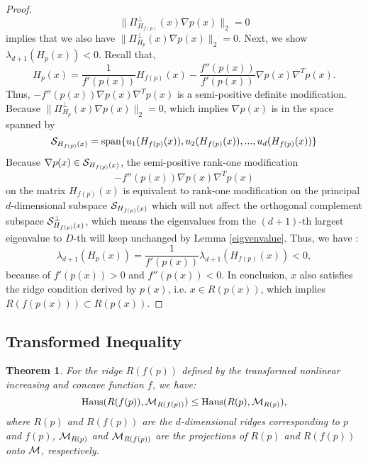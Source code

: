 \documentclass[aos,preprint]{imsart}
\newtheorem{theorem}{Theorem}[section]
\theoremstyle{remark}
\begin{document}
\begin{appendix}
\begin{proof}
\[
\|\Pi_{H_{f(p)}}^{\perp}(x)\nabla p(x)\|_2=0
\] 
implies that we also have $\|\Pi_{H_p}^\perp(x)\nabla p(x)\|_2=0$. Next, we show $\lambda_{d+1}(H_p(x)) < 0$. Recall that, 
\[
 H_{p}(x) =\frac{1}{ f'(p(x))} H_{f(p)}(x) - \frac{f''(p(x))}{ f'(p(x))} \nabla p(x) \nabla^T p(x) .
\]
 Thus, $-{f''(p(x))} \nabla p(x) \nabla^T p(x)$ is a semi-positive definite modification.
 Because $\|\Pi_{H_p}^\perp(x)\nabla p(x)\|_2=0$,  which implies $\nabla p(x)$ is in the space spanned by
 \[
 {\cal S}_{H_{f(p)}(x)} = {\rm span}\{ u_1(H_{f(p)}(x)), u_2(H_{f(p)}(x)),..., u_d(H_{f(p)}(x))\}
 \]
 Because $\nabla p(x) \in  {\cal S}_{H_{f(p)}(x)}$,  the semi-positive rank-one modification
 \[
 -{f''(p(x))} \nabla p(x) \nabla^T p(x)
 \] 
 on the matrix $H_{f(p)}(x)$ is equivalent to rank-one modification on the principal $d$-dimensional subspace ${\cal S}_{H_{f(p)}(x)}$ which will not affect the orthogonal complement subspace ${\cal S}^\perp_{H_{f(p)}(x)}$, which means the
 eigenvalues from the $(d+1)$-th largest eigenvalue to $D$-th will keep unchanged by Lemma \eqref{eigvenvalue}. %
Thus, we have :
\[
\lambda_{d+1}(H_p(x))  = \frac{1}{f'(p(x))} \lambda_{d+1}(H_{f(p)}(x)) < 0, %
\]
because of $f'(p(x))>0$ and ${f''(p(x))}<0$. %
In conclusion, $x$ also satisfies the ridge condition derived by $p(x)$, i.e. $x \in R({p(x)})$, which implies $R({f(p(x))}) \subset R({p(x)})$. 


\end{proof}
\subsection{Transformed Inequality}
\begin{theorem}\label{Transformed Inequality Theorem}
For the ridge $R(f(p))$ defined by the transformed nonlinear increasing and concave function $f$, we have:
\[
{\rm Haus} (R(f(p)), {\cal M}_{R(f(p))}) \leq {\rm Haus} (R(p), {\cal M}_{R(p)}),
\]
where $R(p)$ and $R(f(p))$ are the $d$-dimensional ridges corresponding to $p$ and $f(p)$, ${\cal M}_{R(p)}$ and ${\cal M}_{R(f(p))}$ are the projections of $R(p)$ and $R(f(p))$ onto $\cal M$, respectively.
\end{theorem}


\end{appendix}
\end{document}
